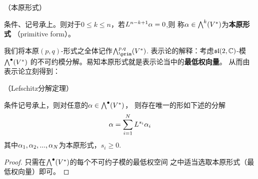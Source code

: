 \begin{definition}（本原形式）

条件、记号承上。则对于$0\leq k\leq n$，若$L^{n-k+1}\alpha=0$,则
称$\alpha\in\bigwedge\nolimits^{k}(V^*)$为\textbf{本原形式}
（primitive form）。
\end{definition}

我们将本原$(p,q)$-形式之全体记作$\wedgeform{p,q}_{\prim}(V^*)$.
表示论的解释：考虑$\mathfrak{sl}(2,\mathbb{C})$-模$\bigwedge\nolimits^{\bullet}(V^*)$
的不可约模分解。易知本原形式就是表示论当中的\textbf{最低权向量}。
从而由表示论立刻得到：

\begin{thm}（Lefschitz分解定理）
\label{LD-局部-thm}

条件记号承上，则对任意的$\alpha\in\bigwedge\nolimits^{\bullet}(V^*)$，
则存在唯一的形如下述的分解
$$
  \alpha=\sum_{i=1}^{N}
    L^{s_i}\alpha_i
$$
其中$\alpha_1,\alpha_2,...,\alpha_N$为本原形式，$s_i\geq 0$.
\end{thm}
\begin{proof}
只需在$\bigwedge\nolimits^{\bullet}(V^*)$的每个不可约子模的最低权空间
之中适当选取本原形式（最低权向量）即可。
\end{proof}

